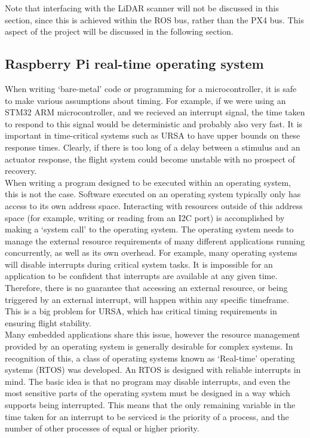 \documentclass[capstone_report.tex]{subfiles}
\begin{document}
    Note that interfacing with the LiDAR scanner will not be discussed in this section, since this is achieved within the ROS bus, rather than the PX4 bus. This aspect of the project will be discussed in the following section.\\

    \subsection{Raspberry Pi real-time operating system}
    When writing `bare-metal' code or programming for a microcontroller, it is safe to make various assumptions about timing. For example, if we were using an STM32 ARM microcontroller, and we recieved an interrupt signal, the time taken to respond to this signal would be deterministic and probably also very fast. It is important in time-critical systems such as URSA to have upper bounds on these response times. Clearly, if there is too long of a delay between a stimulus and an actuator response, the flight system could become unstable with no prospect of recovery. \\

    When writing a program designed to be executed within an operating system, this is not the case. Software executed on an operating system typically only has access to its own address space. Interacting with resources outside of this address space (for example, writing or reading from an I2C port) is accomplished by making a `system call' to the operating system. The operating system needs to manage the external resource requirements of many different applications running concurrently, as well as its own overhead. For example, many operating systems will disable interrupts during critical system tasks. It is impossible for an application to be confident that interrupts are available at any given time. Therefore, there is no guarantee that accessing an external resource, or being triggered by an external interrupt, will happen within any specific timeframe. This is a big problem for URSA, which has critical timing requirements in ensuring flight stability.\\

    Many embedded applications share this issue, however the resource management provided by an operating system is generally desirable for complex systems. In recognition of this, a class of operating systems known as `Real-time' operating systems (RTOS) was developed. An RTOS is designed with reliable interrupts in mind. The basic idea is that no program may disable interrupts, and even the most sensitive parts of the operating system must be designed in a way which supports being interrupted. This means that the only remaining variable in the time taken for an interrupt to be serviced is the priority of a process, and the number of other processes of equal or higher priority.\\
\end{document}
